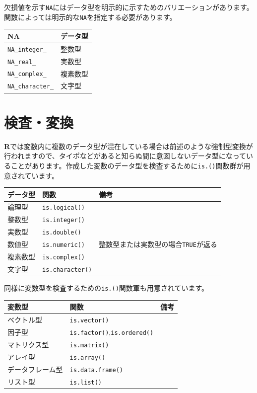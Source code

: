 \documentclass[
  12pt,
]{book}
\begin{document}
欠損値を示す\texttt{NA}にはデータ型を明示的に示すためのバリエーションがあります。関数によっては明示的な\texttt{NA}を指定する必要があります。

\begin{longtable}[]{@{}ll@{}}
\toprule
NA & データ型 \\
\midrule
\endhead
\texttt{NA\_integer\_} & 整数型 \\
\texttt{NA\_real\_} & 実数型 \\
\texttt{NA\_complex\_} & 複素数型 \\
\texttt{NA\_character\_} & 文字型 \\
\bottomrule
\end{longtable}

\hypertarget{ux691cux67fbux5909ux63db}{%
\section{検査・変換}\label{ux691cux67fbux5909ux63db}}

\textbf{R}では変数内に複数のデータ型が混在している場合は前述のような強制型変換が行われますので、タイポなどがあると知らぬ間に意図しないデータ型になっていることがあります。作成した変数のデータ型を検査するために\texttt{is.()}関数群が用意されています。

\begin{longtable}[]{@{}lll@{}}
\toprule
データ型 & 関数 & 備考 \\
\midrule
\endhead
論理型 & \texttt{is.logical()} & \\
整数型 & \texttt{is.integer()} & \\
実数型 & \texttt{is.double()} & \\
数値型 & \texttt{is.numeric()} & 整数型または実数型の場合\texttt{TRUE}が返る \\
複素数型 & \texttt{is.complex()} & \\
文字型 & \texttt{is.character()} & \\
\bottomrule
\end{longtable}

同様に変数型を検査するための\texttt{is.()}関数軍も用意されています。

\begin{longtable}[]{@{}lll@{}}
\toprule
変数型 & 関数 & 備考 \\
\midrule
\endhead
ベクトル型 & \texttt{is.vector()} & \\
因子型 & \texttt{is.factor()},\texttt{is.ordered()} & \\
マトリクス型 & \texttt{is.matrix()} & \\
アレイ型 & \texttt{is.array()} & \\
データフレーム型 & \texttt{is.data.frame()} & \\
リスト型 & \texttt{is.list()} & \\
\bottomrule
\end{longtable}
\end{document}
